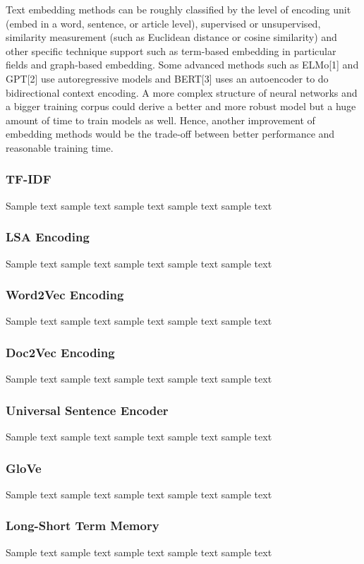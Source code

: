 Text embedding methods can be roughly classified by the level of encoding unit (embed in a word, sentence, or article level), supervised or unsupervised, similarity measurement (such as Euclidean distance or cosine similarity) and other specific technique support such as term-based embedding in particular fields and graph-based embedding.
Some advanced methods such as ELMo[1] and GPT[2] use autoregressive models and BERT[3] uses an autoencoder to do bidirectional context encoding.
A more complex structure of neural networks and a bigger training corpus could derive a better and more robust model but a huge amount of time to train models as well.
Hence, another improvement of embedding methods would be the trade-off between better performance and reasonable training time.

\subsubsection{TF-IDF}
Sample text sample text sample text sample text sample text

\subsubsection{LSA Encoding}
Sample text sample text sample text sample text sample text

\subsubsection{Word2Vec Encoding}
Sample text sample text sample text sample text sample text

\subsubsection{Doc2Vec Encoding}
Sample text sample text sample text sample text sample text

\subsubsection{Universal Sentence Encoder}
Sample text sample text sample text sample text sample text

\subsubsection{GloVe}
Sample text sample text sample text sample text sample text

\subsubsection{Long-Short Term Memory}
Sample text sample text sample text sample text sample text

